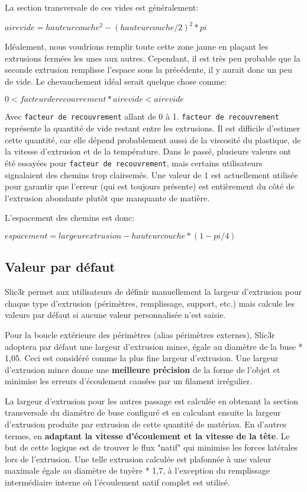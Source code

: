 La section transversale de ces vides est g\'en\'eralement:

$aire vide = hauteur couche^2 - (hauteur couche/2)^2 * pi$

Id\'ealement, nous voudrions remplir toute cette zone jaune en plaçant les extrusions ferm\'ees les unes aux autres. Cependant, il est tr\`es peu probable que la seconde extrusion remplisse l'espace sous la pr\'ec\'edente, il y aurait donc un peu de vide. Le chevauchement id\'eal serait quelque chose comme:


$0 < facteur de recouvrement*aire vide < aire vide$


Avec \texttt{facteur de recouvrement} allant de 0 \`a 1. \texttt{facteur de recouvrement} repr\'esente la quantit\'e de vide restant entre les extrusions. Il est difficile d'estimer cette quantit\'e, car elle d\'epend probablement aussi de la viscosit\'e du plastique, de la vitesse d'extrusion et de la temp\'erature. Dans le pass\'e, plusieurs valeurs ont \'et\'e essay\'ees pour \texttt{facteur de recouvrement}, mais certains utilisateurs signalaient des chemins trop clairsem\'es. Une valeur de 1 est actuellement utilis\'ee pour garantir que l'erreur (qui est toujours pr\'esente) est enti\`erement du côt\'e de l'extrusion abondante plutôt que manquante de mati\`ere.

L'espacement des chemins est donc:

$espacement = largeur extrusion - hauteur couche * (1 - pi/4)$

\subsection{Valeur par d\'efaut} %

Slic3r permet aux utilisateurs de d\'efinir manuellement la largeur d'extrusion pour chaque type d'extrusion (p\'erim\`etres, remplissage, support, etc.) mais calcule les valeurs par d\'efaut si aucune valeur personnalis\'ee n'est saisie.

Pour la boucle ext\'erieure des p\'erim\`etres (alias p\'erim\`etres externes), Slic3r adoptera par d\'efaut une largeur d'extrusion mince, \'egale au diam\`etre de la buse * 1,05. Ceci est consid\'er\'e comme la plus fine largeur d'extrusion. Une largeur d'extrusion mince donne une \textbf{meilleure pr\'ecision} de la forme de l'objet et minimise les erreurs d'\'ecoulement caus\'ees par un filament irr\'egulier.

La largeur d'extrusion pour les autres passage est calcul\'ee en obtenant la section transversale du diam\`etre de buse configur\'e et en calculant ensuite la largeur d'extrusion produite par extrusion de cette quantit\'e de mat\'eriau. En d'autres termes, en \textbf{adaptant la vitesse d'\'ecoulement et la vitesse de la tête}. Le but de cette logique est de trouver le flux "natif" qui minimise les forces lat\'erales lors de l'extrusion. Une telle extrusion calcul\'ee est plafonn\'ee \`a une valeur maximale \'egale au diam\`etre de tuy\`ere * 1,7, \`a l'exception du remplissage interm\'ediaire interne où l'\'ecoulement natif complet est utilis\'e.


